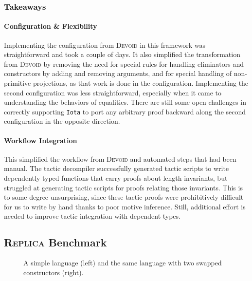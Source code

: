 \subsubsection{Takeaways}

\paragraph{Configuration \& Flexibility}
Implementing the configuration from \textsc{Devoid} in this framework was straightforward and
took a couple of days.
It also simplified the transformation from \textsc{Devoid} by removing the need for special rules for handling eliminators and constructors
by adding and removing arguments, and for special handling of non-primitive projections,
as that work is done in the configuration.
Implementing the second configuration was less straightforward,
especially when it came to understanding the behaviors of equalities.
There are still some open challenges in correctly supporting \lstinline{Iota} to port any arbitrary
proof backward along the second configuration in the opposite direction.

\paragraph{Workflow Integration}
This simplified the workflow from \textsc{Devoid} and automated steps that had been manual.
The tactic decompiler successfully generated tactic scripts to write dependently typed
functions that carry proofs about length invariants, %
but struggled at generating tactic scripts for proofs relating those invariants.
This is to some degree unsurprising, since these tactic proofs
were prohibitively difficult for us to write by hand thanks to poor motive inference.
Still, additional effort is needed to improve tactic integration with dependent types.

\subsection{\textsc{Replica} Benchmark}
\label{sec:replica}

\begin{figure}
\begin{minipage}{0.48\textwidth}
   
\end{minipage}
\hfill
\begin{minipage}{0.48\textwidth}
   
\end{minipage}
\caption{A simple language (left) and the same language with two swapped constructors (right).}
\label{fig:replica}
\end{figure}

